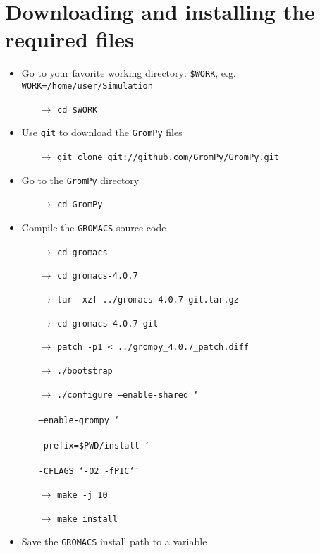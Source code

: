\documentclass[fleqn,a4paper,12pt]{article}
\begin{document}
\section{Downloading and installing the required files}
\begin{itemize}
	\item Go to your favorite working directory: {\tt \$WORK}, e.g. {\tt 
	WORK=/home/user/Simulation}
	\begin{itemize}
		\item[$\to$] {\tt cd \$WORK}
    \end{itemize}
	\item Use {\tt git} to download the {\tt GromPy} files
	\begin{itemize}
		\item[$\to$] {\tt git clone git://github.com/GromPy/GromPy.git}
	\end{itemize}
	\item Go to the {\tt GromPy} directory
	\begin{itemize}
		\item[$\to$] {\tt cd GromPy}
	\end{itemize}
	\item Compile the {\tt GROMACS} source code
	\begin{itemize}
		\item[$\to$] {\tt cd gromacs}
		\item[$\to$] {\tt cd gromacs-4.0.7}
		\item[$\to$] {\tt tar -xzf ../gromacs-4.0.7-git.tar.gz} 
		\item[$\to$] {\tt cd gromacs-4.0.7-git}
		\item[$\to$] {\tt patch -p1 < ../grompy\_4.0.7\_patch.diff}
		\item[$\to$] {\tt ./bootstrap} 
		\item[$\to$] {\tt ./configure --enable-shared \char`\\ }\\
					   {\tt --enable-grompy \char`\\} \\
				       {\tt --prefix=\$PWD/install \char`\\}\\
				       {\tt -CFLAGS \char`\"-O2 -fPIC\char`\"}
		\item[$\to$] {\tt make -j 10}
		\item[$\to$] {\tt make install}
	\end{itemize}
	\item Save the {\tt GROMACS} install path to a variable

\end{itemize}
\end{document}
